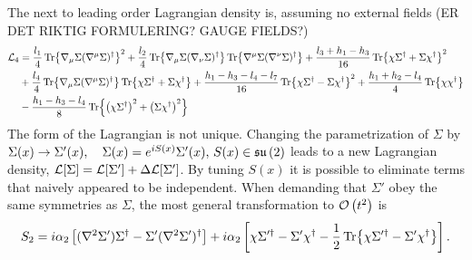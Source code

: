 \documentclass{article}
\begin{document}
The next to leading order Lagrangian density is, assuming no external fields (ER DET RIKTIG FORMULERING? GAUGE FIELDS?)
\begin{align}
    \notag
    \Ell_4 
    & = 
    \frac{l_1}{4} \Tr{\nabla_\mu \Sigma (\nabla^\mu \Sigma)^\dagger}^2
    + \frac{l_2}{4} \Tr{\nabla_\mu \Sigma (\nabla_\nu \Sigma)^\dagger} 
    \Tr{\nabla^\mu \Sigma (\nabla^\nu \Sigma)^\dagger} 
    +
    \frac{l_3 + h_1 - h_3 }{16} \Tr{\chi \Sigma^\dagger + \Sigma \chi^\dagger}^2
    \\ \notag
    &
    + \frac{l_4}{4}\Tr{\nabla_\mu \Sigma (\nabla^\mu \Sigma)^\dagger} \Tr{\chi \Sigma^\dagger + \Sigma \chi^\dagger}
    + \frac{h_1 - h_3 - l_4-l_7}{16} \Tr{\chi \Sigma^\dagger - \Sigma \chi^\dagger}^2
    + \frac{h_1 + h_2 - l_4}{4} \Tr{\chi \chi^\dagger} \\
    & -
    \frac{h_1 - h_3 - l_4}{8} 
        \Tr{\left(\chi \Sigma^\dagger\right)^2 + \left( \Sigma \chi^\dagger\right)^2}
    \label{NLO Lagrangian}
\end{align}
The form of the Lagrangian is not unique.
Changing the parametrization of $\Sigma$ by $\Sigma(x) \rightarrow \Sigma'(x), \quad \Sigma(x) = e^{iS(x)} \Sigma'(x), \, S(x) \in \liea{su}{2}$ leads to a new Lagrangian density, $\Ell[\Sigma] = \Ell[\Sigma'] + \Delta \Ell[\Sigma']$.
By tuning $S(x)$ it is possible to eliminate terms that naively appeared to be independent.
When demanding that $\Sigma'$ obey the same symmetries as $\Sigma$, the most general transformation to $\Oh[2]{t}$ is
\begin{equation*}
    S_{2} = 
    i \alpha_2 
    \left[
        (\nabla^2 \Sigma') \Sigma^\dagger - \Sigma' (\nabla^2 {\Sigma'})^\dagger
    \right]
    + i \alpha_2
    \left[
        \chi \Sigma'^\dagger - \Sigma' \chi^\dagger 
        - \frac{1}{2} \Tr{\chi \Sigma'^\dagger - \Sigma' \chi^\dagger}
    \right].
\end{equation*}
\end{document}
